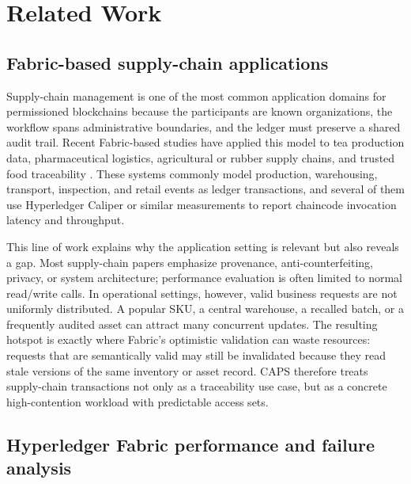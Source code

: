 \documentclass[fleqn,10pt,lineno]{wlpeerj}
\begin{document}
\section*{Related Work}

\subsection*{Fabric-based supply-chain applications}

Supply-chain management is one of the most common application domains for permissioned blockchains because the participants are known organizations, the workflow spans administrative boundaries, and the ledger must preserve a shared audit trail. Recent Fabric-based studies have applied this model to tea production data, pharmaceutical logistics, agricultural or rubber supply chains, and trusted food traceability \citep{chen2023tea,dash2024hcsrl,keo2025rubber,zhou2026trusted}. These systems commonly model production, warehousing, transport, inspection, and retail events as ledger transactions, and several of them use Hyperledger Caliper or similar measurements to report chaincode invocation latency and throughput.

This line of work explains why the application setting is relevant but also reveals a gap. Most supply-chain papers emphasize provenance, anti-counterfeiting, privacy, or system architecture; performance evaluation is often limited to normal read/write calls. In operational settings, however, valid business requests are not uniformly distributed. A popular SKU, a central warehouse, a recalled batch, or a frequently audited asset can attract many concurrent updates. The resulting hotspot is exactly where Fabric's optimistic validation can waste resources: requests that are semantically valid may still be invalidated because they read stale versions of the same inventory or asset record. CAPS therefore treats supply-chain transactions not only as a traceability use case, but as a concrete high-contention workload with predictable access sets.

\subsection*{Hyperledger Fabric performance and failure analysis}
\end{document}
